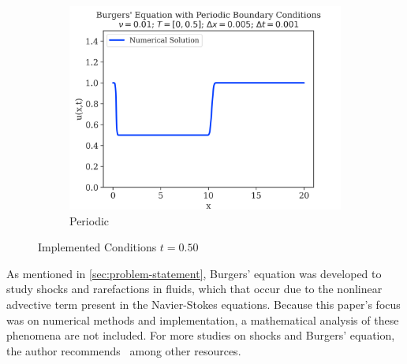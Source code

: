 \begin{figure}
\begin{subfigure}{0.55\linewidth}
		\includegraphics[width=\linewidth]{../periodic_BC/images_nu=0.01/500_plot}
		\caption{Periodic}
	\end{subfigure}
	\hfill

	\caption{Implemented Conditions $t=0.50$}
	\label{fig:final-figures}
\end{figure}

As mentioned in \cref{sec:problem-statement}, Burgers' equation was developed to study shocks and rarefactions in fluids, which that occur due to the nonlinear advective term present in the Navier-Stokes equations.
Because this paper's focus was on numerical methods and implementation, a mathematical analysis of these phenomena are not included.
For more studies on shocks and Burgers' equation, the author recommends~\autocite{salihBurgersEquation2016,cameronNOTESBURGERSEQUATION} among other resources.